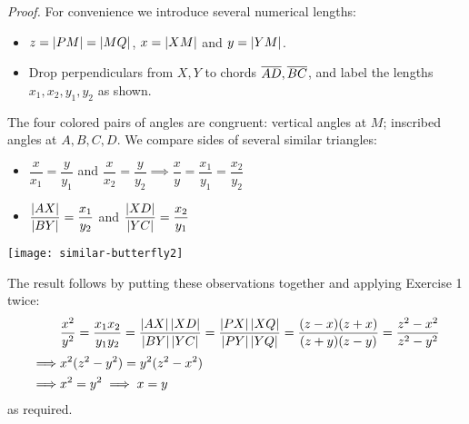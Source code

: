 \begin{tcolorbox}[proofstyle]
	\begin{minipage}[t]{0.58\linewidth}\vspace{0pt}
		\emph{Proof.}\lstsp
		For convenience we introduce several numerical lengths:
		\begin{itemize}
		  \item $z=\left| PM\right|=\left| MQ\right|$, $x=\left| XM\right|$ and $y=\left| YM\right|$.
		  \item Drop perpendiculars from $X,Y$ to chords $\overline{AD},\overline{BC}$, and label the lengths $x_1,x_2,y_1,y_2$ as shown.
		\end{itemize}
		The four colored pairs of angles are congruent: vertical angles at $M$; inscribed angles at $A,B,C,D$.\smallbreak
		We compare sides of several similar triangles:
		\begin{itemize}
		  \item $\dfrac{x}{x_1}=\dfrac{y}{y_1}$ and $\dfrac{x}{x_2}=\dfrac{y}{y_2} \implies \dfrac xy=\dfrac{x_1}{y_1}=\dfrac{x_2}{y_2}$
		  \item $\dfrac{\left| AX\right|}{\left| BY\right|}=\dfrac{x_1}{y_2}$ and $\dfrac{\left| XD\right|}{\left| YC\right|}=\dfrac{x_2}{y_1}$
		\end{itemize}
	\end{minipage}
	\hfill
	\begin{minipage}[t]{0.39\linewidth}\vspace{0pt}
		\flushright
		\texttt{[image: similar-butterfly2]}
	\end{minipage}\medbreak
	The result follows by putting these observations together and applying Exercise 1  twice:\footnotemark
	\begin{align*}
		&\frac{x^2}{y^2}=\frac{x_1x_2}{y_1y_2}=\frac{\nm{AX}\nm{XD}}{\nm{BY}\nm{YC}} =\frac{\nm{PX}\nm{XQ}}{\nm{PY}\nm{YQ}} =\frac{(z-x)(z+x)}{(z+y)(z-y)} =\frac{z^2-x^2}{z^2-y^2}\\[2pt]
		\implies & x^2(z^2-y^2)=y^2(z^2-x^2)\\
		\implies &x^2=y^2\implies x=y%
	\end{align*}
	as required.\hfill\qedsymbol
\end{tcolorbox}


\vfil

